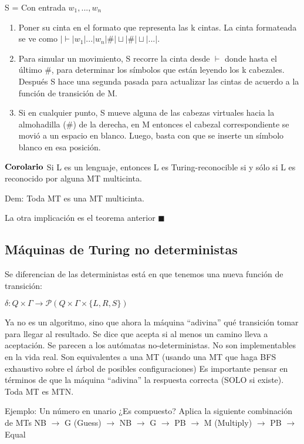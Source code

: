 \documentclass{homework}
\begin{document}
S = Con entrada $w_1,...,w_n$
\begin{enumerate}
	\item Poner su cinta en el formato que representa las k cintas. La cinta formateada se ve como $| \vdash | w_1 | ... | w_n | \# | \sqcup | \# | \sqcup | ...|$.
	\item Para simular un movimiento, S recorre la cinta desde $\vdash$  donde hasta el último $\#$, para determinar los símbolos que están leyendo los k cabezales. Después S hace una segunda pasada para actualizar las cintas de acuerdo a la función de transición de M.
	\item Si en cualquier punto, S mueve alguna de las cabezas virtuales hacia la almohadilla ($\#$) de la derecha, en M entonces el cabezal correspondiente se movió a un espacio en blanco. Luego, basta con que se inserte un símbolo blanco en esa posición.
\end{enumerate}


$\bf{Corolario}$ Si L es un lenguaje, entonces L es Turing-reconocible si y sólo si L es reconocido por alguna MT multicinta.

Dem: Toda MT es una MT multicinta.

La otra implicación es el teorema anterior $\blacksquare$

\subsection{M\'aquinas de Turing no deterministas}

Se diferencian de las deterministas está en que tenemos una nueva función de transición:

$\delta : Q \times \Gamma \rightarrow \mathcal{P}(Q \times \Gamma \times \{L, R, S\})$

Ya no es un algoritmo, sino que ahora la máquina “adivina” qué transición tomar para llegar al resultado.
Se dice que acepta si al menos un camino lleva a aceptación.
Se parecen a los autómatas no-deterministas.
No son implementables en la vida real.
Son equivalentes a una MT (usando una MT que haga BFS exhaustivo sobre el árbol de posibles configuraciones)
Es importante pensar en términos de que la máquina “adivina” la respuesta correcta (SOLO si existe).
Toda MT es MTN.

Ejemplo: Un número en unario ¿Es compuesto?
Aplica la siguiente combinación de MTs NB $\rightarrow$ G (Guess) $\rightarrow$ NB $\rightarrow$ G $\rightarrow$ PB $\rightarrow$ M (Multiply) $\rightarrow$ PB $\rightarrow$ Equal
\end{document}
